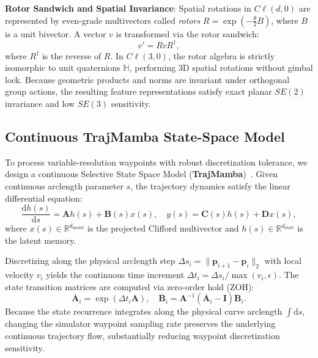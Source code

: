 \textbf{Rotor Sandwich and Spatial Invariance}:
Spatial rotations in $C\ell(d, 0)$ are represented by even-grade multivectors called \emph{rotors} $R = \exp(-\frac{\theta}{2} B)$, where $B$ is a unit bivector.
A vector $v$ is transformed via the rotor sandwich:
\begin{equation}
v' = R v R^\dagger,
\end{equation}
where $R^\dagger$ is the reverse of $R$.
In $C\ell(3,0)$, the rotor algebra is strictly isomorphic to unit quaternions $\mathbb{H}$, performing 3D spatial rotations without gimbal lock.
Because geometric products and norms are invariant under orthogonal group actions, the resulting feature representations satisfy exact planar $SE(2)$ invariance and low $SE(3)$ sensitivity.

\subsection{Continuous TrajMamba State-Space Model}

To process variable-resolution waypoints with robust discretization tolerance, we design a continuous Selective State Space Model (\textbf{TrajMamba})~\cite{mamba}.
Given continuous arclength parameter $s$, the trajectory dynamics satisfy the linear differential equation:
\begin{equation}
\frac{\mathrm{d}h(s)}{\mathrm{d}s} = \mathbf{A} h(s) + \mathbf{B}(s) x(s), \quad y(s) = \mathbf{C}(s) h(s) + \mathbf{D} x(s),
\end{equation}
where $x(s) \in \mathbb{R}^{d_{\mathrm{model}}}$ is the projected Clifford multivector and $h(s) \in \mathbb{R}^{d_{\mathrm{state}}}$ is the latent memory.

Discretizing along the physical arclength step $\Delta s_i = \|\mathbf{p}_{i+1} - \mathbf{p}_i\|_2$ with local velocity $v_i$ yields the continuous time increment $\Delta t_i = \Delta s_i / \max(v_i, \epsilon)$.
The state transition matrices are computed via zero-order hold (ZOH):
\begin{equation}
\overline{\mathbf{A}}_i = \exp(\Delta t_i \mathbf{A}), \quad \overline{\mathbf{B}}_i = \mathbf{A}^{-1}(\overline{\mathbf{A}}_i - \mathbf{I}) \mathbf{B}_i.
\end{equation}
Because the state recurrence integrates along the physical curve arclength $\int \mathrm{d}s$, changing the simulator waypoint sampling rate preserves the underlying continuous trajectory flow, substantially reducing waypoint discretization sensitivity.

